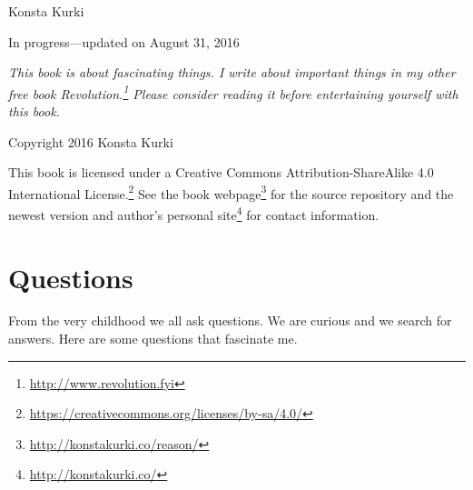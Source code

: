 \documentclass[11pt,oneside,%
]{memoir}
\theoremstyle{definition}
\begin{document}
\frontmatter

\thispagestyle{empty}


\vspace{0.3in}

\noindent Konsta Kurki

\vspace{0.3in}

\noindent In progress---updated on August 31, 2016

\vfill

\noindent\emph{This book is about fascinating things. I write about important things in my other free book \emph{Revolution}.\footnote{\url{http://www.revolution.fyi}} Please consider reading it before entertaining yourself with this book.}

\vfill

\noindent Copyright {\textcopyright} 2016 Konsta Kurki

\vspace{0.18in}

\noindent This book is licensed under a Creative Commons Attribution-ShareAlike 4.0 International License.\footnote{\url{https://creativecommons.org/licenses/by-sa/4.0/}} See the book webpage\footnote{\url{http://konstakurki.co/reason/}} for the source repository and the newest version and author's personal site\footnote{\url{http://konstakurki.co/}} for contact information.

\newpage

\mainmatter

\tableofcontents

\chapter{Questions}

From the very childhood we all ask questions. We are curious and we search for answers. Here are some questions that fascinate me.
\end{document}
